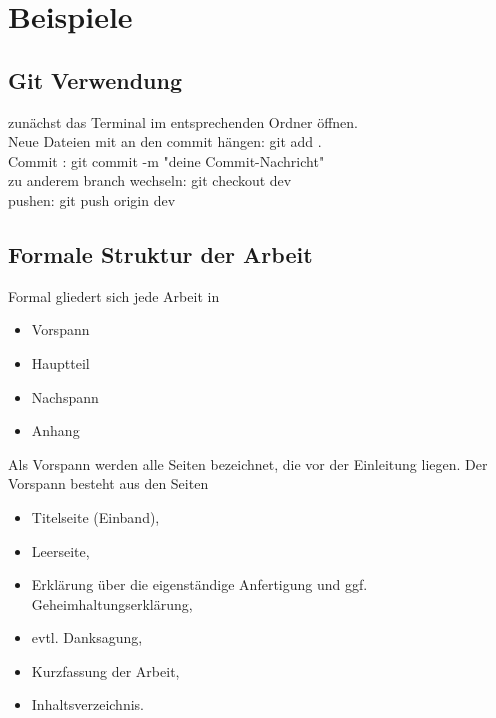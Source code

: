\clearpage
\chapter{\textbf{Beispiele}}\label{beispiele}


\section {Git Verwendung}

zunächst das Terminal im entsprechenden Ordner öffnen. \\
Neue Dateien mit an den commit hängen: \hspace{2cm} git add .\\
Commit : \hspace{8cm} git commit -m "deine Commit-Nachricht"\\
zu anderem branch wechseln:\hspace{2cm}  git checkout dev \\
pushen: \hspace{7cm}  git push origin dev \\

\section{Formale Struktur der Arbeit}

Formal gliedert sich jede Arbeit in  
\begin{itemize}
\item Vorspann
\item Hauptteil
\item Nachspann 
\item Anhang
\end{itemize}
\vspace{0.5cm}

Als Vorspann werden alle Seiten bezeichnet, die vor der Einleitung liegen. Der Vorspann 
besteht aus den Seiten 

\begin{itemize}
\item Titelseite (Einband), 
\item Leerseite,
\item Erklärung über die eigenständige Anfertigung und ggf. Geheimhaltungserklärung, 
\item evtl. Danksagung, 
\item Kurzfassung der Arbeit,  
\item  Inhaltsverzeichnis.
\end{itemize}
\vspace{0.5cm}

